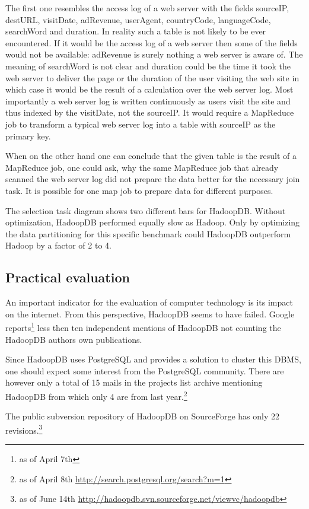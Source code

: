 \documentclass[12pt,a4paper]{scrartcl}		%
\begin{document}
The first one resembles the access log of a web server with the fields sourceIP, destURL, visitDate, adRevenue, userAgent, countryCode, languageCode, searchWord and duration. In reality such a table is not likely to be ever encountered. If it would be the access log of a web server then some of the fields would not be available: adRevenue is surely nothing a web server is aware of. The meaning of searchWord is not clear and duration could be the time it took the web server to deliver the page or the duration of the user visiting the web site in which case it would be the result of a calculation over the web server log. Most importantly a web server log is written continuously as users visit the site and thus indexed by the visitDate, not the sourceIP. It would require a MapReduce job to transform a typical web server log into a table with sourceIP as the primary key.

When on the other hand one can conclude that the given table is the result of a MapReduce job, one could ask, why the same MapReduce job that already scanned the web server log did not prepare the data better for the necessary join task. It is possible for one map job to prepare data for different purposes.

The selection task diagram shows two different bars for HadoopDB. Without optimization, HadoopDB performed equally slow as Hadoop. Only by optimizing the data partitioning for this specific benchmark could HadoopDB outperform Hadoop by a factor of 2 to 4.

\subsection{Practical evaluation}

An important indicator for the evaluation of computer technology is its impact on the internet. From this perspective, HadoopDB seems to have failed. Google reports\footnote{as of April 7th} less then ten independent mentions of HadoopDB not counting the HadoopDB authors own publications.

Since HadoopDB uses PostgreSQL and provides a solution to cluster this DBMS, one should expect some interest from the PostgreSQL community. There are however only a total of 15 mails in the projects list archive mentioning HadoopDB from which only 4 are from last year.\footnote{as of April 8th \url{http://search.postgresql.org/search?m=1}}

The public subversion repository of HadoopDB on SourceForge has only 22 revisions.\footnote{as of June 14th \url{http://hadoopdb.svn.sourceforge.net/viewvc/hadoopdb}}
\end{document}
